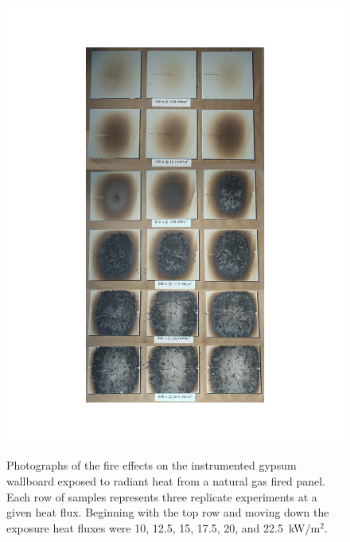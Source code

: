 \documentclass[twoside]{uocthesis}
\begin{document}
\begin{figure}[p]
	\centering
	\includegraphics[width=\textwidth]{../Figures/RPGB_SET} \\
	\caption[Photographs of the fire effects on the instrumented gypsum wallboard exposed to radiant heat from a natural gas fired panel.  ]{Photographs of the fire effects on the instrumented gypsum wallboard exposed to radiant heat from a natural gas fired panel.  Each row of samples represents three replicate experiments at a given heat flux. Beginning with the top row and moving down the exposure heat fluxes were 10, 12.5, 15, 17.5, 20, and 22.5~kW/m$^2$.}
	\label{RPGB_SET}
\end{figure}
\end{document}
